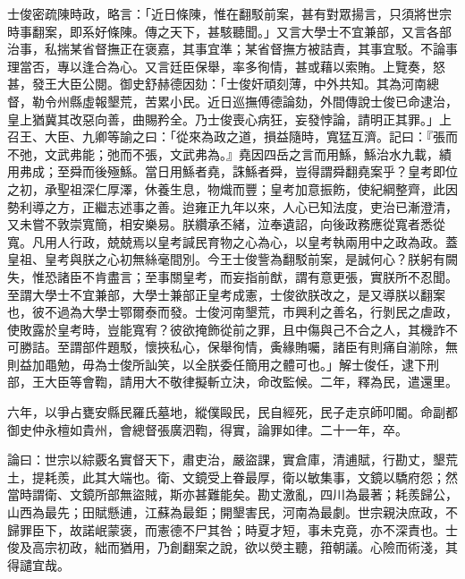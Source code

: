 \begin{pinyinscope}
士俊密疏陳時政，略言：「近日條陳，惟在翻駁前案，甚有對眾揚言，只須將世宗時事翻案，即系好條陳。傳之天下，甚駭聽聞。」又言大學士不宜兼部，又言各部治事，私揣某省督撫正在褒嘉，其事宜準；某省督撫方被詰責，其事宜駁。不論事理當否，專以逢合為心。又言廷臣保舉，率多徇情，甚或藉以索賄。上覽奏，怒甚，發王大臣公閱。御史舒赫德因劾：「士俊奸頑刻薄，中外共知。其為河南總督，勒令州縣虛報墾荒，苦累小民。近日巡撫傅德論劾，外間傳說士俊已命逮治，皇上猶冀其改惡向善，曲賜矜全。乃士俊喪心病狂，妄發悖論，請明正其罪。」上召王、大臣、九卿等諭之曰：「從來為政之道，損益隨時，寬猛互濟。記曰：『張而不弛，文武弗能；弛而不張，文武弗為。』堯因四岳之言而用鯀，鯀治水九載，績用弗成；至舜而後殛鯀。當日用鯀者堯，誅鯀者舜，豈得謂舜翻堯案乎？皇考即位之初，承聖祖深仁厚澤，休養生息，物熾而豐；皇考加意振飭，使紀綱整齊，此因勢利導之方，正繼志述事之善。迨雍正九年以來，人心已知法度，吏治已漸澄清，又未嘗不敦崇寬簡，相安樂易。朕纘承丕緒，泣奉遺詔，向後政務應從寬者悉從寬。凡用人行政，兢兢焉以皇考諴民育物之心為心，以皇考執兩用中之政為政。蓋皇祖、皇考與朕之心初無絲毫間別。今王士俊訾為翻駁前案，是誠何心？朕躬有闕失，惟恐諸臣不肯盡言；至事關皇考，而妄指前猷，謂有意更張，實朕所不忍聞。至謂大學士不宜兼部，大學士兼部正皇考成憲，士俊欲朕改之，是又導朕以翻案也，彼不過為大學士鄂爾泰而發。士俊河南墾荒，市興利之善名，行剝民之虐政，使敗露於皇考時，豈能寬宥？彼欲掩飾從前之罪，且中傷與己不合之人，其機詐不可勝詰。至謂部件題駁，懷挾私心，保舉徇情，夤緣賄囑，諸臣有則痛自湔除，無則益加黽勉，毋為士俊所訕笑，以全朕委任簡用之體可也。」解士俊任，逮下刑部，王大臣等會鞫，請用大不敬律擬斬立決，命改監候。二年，釋為民，遣還里。

六年，以爭占甕安縣民羅氏墓地，縱僕毆民，民自經死，民子走京師叩閽。命副都御史仲永檀如貴州，會總督張廣泗鞫，得實，論罪如律。二十一年，卒。

論曰：世宗以綜覈名實督天下，肅吏治，嚴盜課，實倉庫，清逋賦，行勘丈，墾荒土，提耗羨，此其大端也。衛、文鏡受上眷最厚，衛以敏集事，文鏡以驕府怨；然當時謂衛、文鏡所部無盜賊，斯亦甚難能矣。勘丈激亂，四川為最著；耗羨歸公，山西為最先；田賦懸逋，江蘇為最鉅；開墾害民，河南為最劇。世宗親決庶政，不歸罪臣下，故諾岷蒙褒，而憲德不尸其咎；時夏才短，事未克竟，亦不深責也。士俊及高宗初政，絀而猶用，乃創翻案之說，欲以熒主聽，箝朝議。心險而術淺，其得譴宜哉。


\end{pinyinscope}